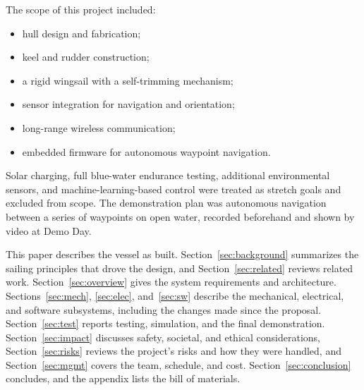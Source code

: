 The scope of this project included:
\begin{itemize}
\item hull design and fabrication;
\item keel and rudder construction;
\item a rigid wingsail with a self-trimming mechanism;
\item sensor integration for navigation and orientation;
\item long-range wireless communication;
\item embedded firmware for autonomous waypoint navigation.
\end{itemize}
Solar charging, full blue-water endurance testing, additional environmental
sensors, and machine-learning-based control were treated as stretch goals
and excluded from scope. The demonstration plan was autonomous navigation
between a series of waypoints on open water, recorded beforehand and shown by
video at Demo Day.

This paper describes the vessel as built. Section~\ref{sec:background}
summarizes the sailing principles that drove the design, and
Section~\ref{sec:related} reviews related work. Section~\ref{sec:overview}
gives the system requirements and architecture. Sections~\ref{sec:mech},
\ref{sec:elec}, and~\ref{sec:sw} describe the mechanical, electrical, and
software subsystems, including the changes made since the proposal.
Section~\ref{sec:test} reports testing, simulation, and the final
demonstration. Section~\ref{sec:impact} discusses safety, societal, and
ethical considerations, Section~\ref{sec:risks} reviews the project's risks
and how they were handled, and Section~\ref{sec:mgmt} covers the team,
schedule, and cost. Section~\ref{sec:conclusion} concludes, and the appendix
lists the bill of materials.